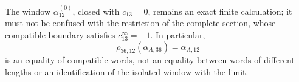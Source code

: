 The window \(\alpha_{12}^{(0)}\), closed with \(c_{13}=0\), remains an
exact finite calculation; it must not be confused with the restriction of the
complete section, whose compatible boundary satisfies \(c_{13}^{\infty}=-1\). In
particular,
\begin{equation}
 \rho_{36,12}(\alpha_{A,36})=\alpha_{A,12}
 \label{eq:alpha-rho-36-12-proyectiva}
\end{equation}
is an equality of compatible words, not an equality between words of
different lengths or an identification of the isolated window with the
limit.



